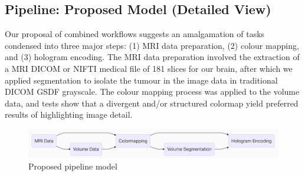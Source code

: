 \subsection{Pipeline: Proposed Model (Detailed View)}
Our proposal of combined workflows suggests an amalgamation of tasks condensed into three major steps: (1) MRI data preparation, (2) colour mapping, and (3) hologram encoding.  The MRI data preparation involved the extraction of a MRI DICOM or NIFTI medical file of 181 slices for our brain, after which we applied segmentation to isolate the tumour in the image data in traditional DICOM GSDF grayscale.  The colour mapping process was applied to the volume data, and tests show that a divergent and/or structured colormap yield preferred results of highlighting image detail.

\begin{figure}[t]
 \centering %
 \includegraphics[width=\columnwidth]{pictures/proposed-model.png}
 \caption{Proposed pipeline model}
 \label{fig:proposed-model}
\end{figure}